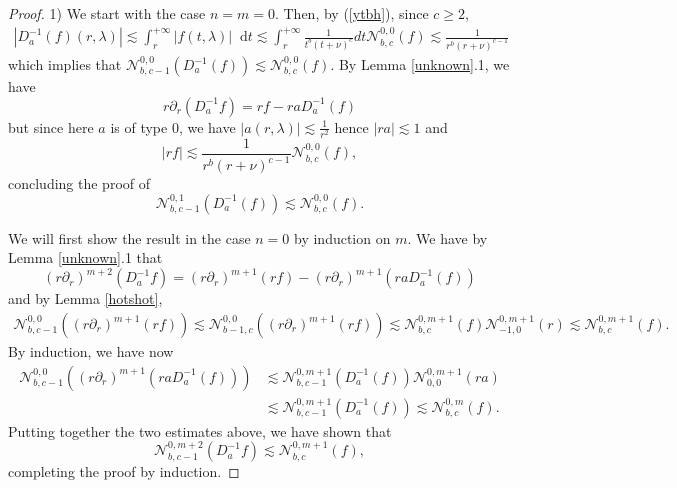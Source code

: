 \documentclass[11 pt]{amsart}
\theoremstyle{definition}
\theoremstyle{remark}
\numberwithin{equation}{section}
\newcommand{\dd}{\mathop{}\!\mathrm{d}}
\begin{document}
\begin{proof}
1) We start with the case $n = m = 0$. Then, by (\ref{ytbh}), since $c
  \geqslant 2$,
  \begin{eqnarray*}
    | D_a^{- 1} (f) (r, \lambda) |  \lesssim  \int_r^{+ \infty} | f (t,
    \lambda) |\dd t  \lesssim  \int_r^{+ \infty} \frac{1}{t^b (t + \nu)^c} d
    t\mathcal{N}_{b, c}^{0, 0} (f) \lesssim  \frac{1}{r^b (r + \nu)^{c - 1}}
  \end{eqnarray*}
  which implies that $\mathcal{N}_{b, c - 1}^{0, 0} (D_a^{- 1} (f)) \lesssim
  \mathcal{N}_{b, c}^{0, 0} (f)$. By Lemma \ref{unknown}.1, we have
  \[ r \partial_r (D_a^{- 1} f) = r f - r a D_a^{- 1} (f) \]
  but since here $a$ is of type $0$, we have $| a (r, \lambda) | \lesssim
  \frac{1}{r^2}$ hence $| r a | \lesssim 1$ and
  \[ | r f | \lesssim \frac{1}{r^b (r + \nu)^{c - 1}} \mathcal{N}_{b, c}^{0,
     0} (f), \]
  concluding the proof of
  \[ \mathcal{N}_{b, c - 1}^{0, 1} (D_a^{- 1} (f)) \lesssim \mathcal{N}_{b,
     c}^{0, 0} (f) . \]

 We will first show the result in the case $n = 0$ by induction on $m$. We have
  by Lemma \ref{unknown}.1 that
  \[ (r \partial_r)^{m + 2} (D_a^{- 1} f) = (r \partial_r)^{m + 1} (r f) - (r
     \partial_r)^{m + 1} (r a D_a^{- 1} (f)) \]
  and by Lemma \ref{hotshot},
  \begin{eqnarray*}
    \mathcal{N}_{b, c - 1}^{0, 0} ((r \partial_r)^{m + 1} (r f)) \lesssim 
    \mathcal{N}_{b - 1, c}^{0, 0} ((r \partial_r)^{m + 1} (r f)) \lesssim  \mathcal{N}_{b, c}^{0, m + 1} (f) \mathcal{N}_{- 1, 0}^{0, m + 1} (r) \lesssim \mathcal{N}_{b, c}^{0, m + 1} (f) .
  \end{eqnarray*}
  By induction, we have now
  \begin{align*}
    \mathcal{N}_{b, c - 1}^{0, 0} ((r \partial_r)^{m + 1} (r a D_a^{- 1} (f)))
    & \lesssim \mathcal{N}_{b, c - 1}^{0, m + 1} (D_a^{- 1} (f))
    \mathcal{N}_{0, 0}^{0, m + 1} (r a)\\
    & \lesssim \mathcal{N}_{b, c - 1}^{0, m + 1} (D_a^{- 1} (f)) \lesssim  \mathcal{N}_{b, c}^{0, m} (f) .
  \end{align*}
Putting together the two estimates above, we have shown that
  \begin{equation}
    \mathcal{N}_{b, c - 1}^{0, m + 2} (D_a^{- 1} f) \lesssim \mathcal{N}_{b,
    c}^{0, m + 1} (f),
  \end{equation}
  completing the proof by induction. 
  

\end{proof}
\end{document}
